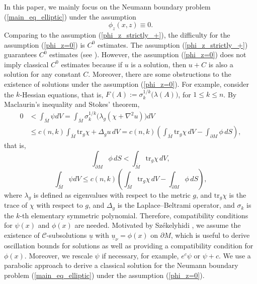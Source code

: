 \documentclass[12pt]{amsart}
\newcommand{\tr}{\mbox{tr}}
\theoremstyle{definition}
\theoremstyle{remark}
\numberwithin{equation}{section}
\begin{document}
In this paper, we mainly focus on the Neumann boundary problem (\ref{main_eq_elliptic}) under the assumption 
\begin{equation}\label{phi_z=0}
	\phi_z(x, z) \equiv 0.
\end{equation}
Comparing to the assumption (\ref{phi_z_strictly_+}), the difficulty for the assumption (\ref{phi_z=0}) is $C^0$ estimates. 
The assumption (\ref{phi_z_strictly_+}) guarantees $C^0$ estimates (see \cite{Tru87}).
However, the assumption (\ref{phi_z=0}) does not imply classical $C^0$ estimates because if $u$ is a solution, then $u + C$ is also a solution for any constant $C$. 
Moreover, there are some obstructions to the existence of solutions under the assumption (\ref{phi_z=0}). For example, consider the $k$-Hessian equations, that is, $F(A) := \sigma_k^{1/k} \big(\lambda(A)\big)$, for $1 \leq k \leq n$. By Maclaurin's inequality and Stokes' theorem, 
\begin{equation}
\begin{aligned}
0 &< \int_{\overline{M}} \psi dV = 	\int_{\overline{M}} \sigma_k^{1/k}\big(\lambda_g (\chi + \nabla^2 u)\big) dV	\\
&\leq c(n,k) \int_{\overline{M}} \tr_g \chi + \Delta_g u \,dV 
= c(n,k) \left( \int_{\overline{M}} \tr_g \chi \,dV - \int_{\partial M} \phi \,dS \right),
\end{aligned}
\end{equation}
that is, 
\begin{equation}
	\int_{\partial M} \phi \,dS < \int_{\overline{M}} \tr_g \chi \,dV,
\end{equation}
\begin{equation}
	\int_{\overline{M}} \psi dV \leq c(n,k) \left( \int_{\overline{M}} \tr_g \chi \,dV - \int_{\partial M} \phi \,dS \right),
\end{equation}
where $\lambda_g$ is defined as eigenvalues with respect to the metric $g$, and $\tr_g \chi$ is the trace of $\chi$ with respect to $g$, and $\Delta_g$ is the Laplace–Beltrami operator, and $\sigma_k$ is the $k$-th elementary symmetric polynomial.
Therefore, compatibility conditions for $\psi(x)$ and $\phi(x)$ are needed. 
Motivated by Sz\'ekelyhidi \cite{Sze15}, we
assume the existence of $\mathcal{C}$-subsolutions $\underline{u}$ with $\underline{u}_\nu = \phi(x)$ on $\partial M$, which is useful to derive oscillation bounds for solutions as well as providing a compatibility condition for $\phi(x)$.
Moreover, we rescale $\psi$ if necessary, for example, $e^c \psi$ or $\psi + c$.
We use a parabolic approach to derive a classical solution for the Neumann boundary problem (\ref{main_eq_elliptic}) under the assumption (\ref{phi_z=0}). 
\end{document}
